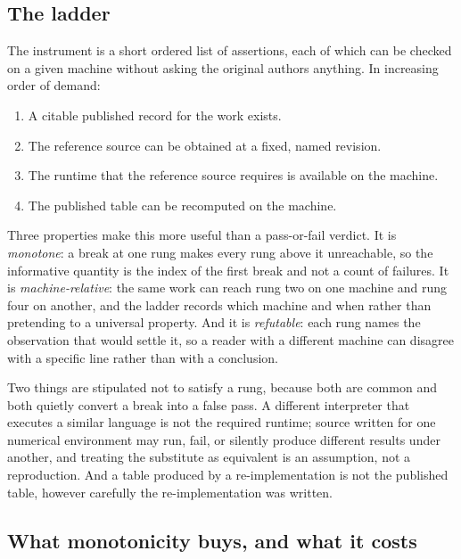 
\subsection{The ladder}

The instrument is a short ordered list of assertions, each of which can be
checked on a given machine without asking the original authors anything. In
increasing order of demand:

\begin{enumerate}
\item A citable published record for the work exists.
\item The reference source can be obtained at a fixed, named revision.
\item The runtime that the reference source requires is available on the machine.
\item The published table can be recomputed on the machine.
\end{enumerate}

Three properties make this more useful than a pass-or-fail verdict. It is
\emph{monotone}: a break at one rung makes every rung above it unreachable, so
the informative quantity is the index of the first break and not a count of
failures. It is \emph{machine-relative}: the same work can reach rung two on one
machine and rung four on another, and the ladder records which machine and when
rather than pretending to a universal property. And it is \emph{refutable}: each
rung names the observation that would settle it, so a reader with a different
machine can disagree with a specific line rather than with a conclusion.

Two things are stipulated not to satisfy a rung, because both are common and
both quietly convert a break into a false pass. A different interpreter that
executes a similar language is not the required runtime; source written for one
numerical environment may run, fail, or silently produce different results under
another, and treating the substitute as equivalent is an assumption, not a
reproduction. And a table produced by a re-implementation is not the published
table, however carefully the re-implementation was written.

\subsection{What monotonicity buys, and what it costs}

